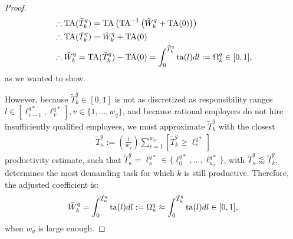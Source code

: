 \documentclass[hidelinks, nonatbib]{elsarticle}
\begin{document}
\begin{corollary}
\begin{proof}
\begin{align}
            &
            \therefore
            \text{TA}
            (
                \tilde{T}_{k}^{q}
            )
            =
            \text{TA}
            \left(
                \text{TA}^{-1}
                \left(
                    \tilde{W}_{k}^{q}
                    +
                    \text{TA}(0)
                \right)
            \right)
            \\
            &
            \therefore
            \text{TA}
            (
                \tilde{T}_{k}^{q}
            )
            =
            \tilde{W}_{k}^{q}
            +
            \text{TA}(0)
            \\
            &
            \therefore
            \tilde{W}_{k}^{q}
            =
            \text{TA}
            (
                \tilde{T}_{k}^{q}
            )
            -
            \text{TA}(0)
            =
            \int_{0}^{\tilde{T}_{k}^{q}}
            \text{ta}(l)
            dl
            :=
            \Omega_{k}^{q}
            \in 
            [0,1]
            ,
        \end{align}
        as we wanted to show.
        
        However, because $\tilde{T}_{k}^{q} \in [0,1]$ is not as discretized as responsibility ranges $l \in [\ell_{v-1}^{q*},\ell_{v}^{q*}], v \in \{1, \dots, w_q\}$, and because rational employers do not hire insufficiently qualified employees, we must approximate $\tilde{T}_{k}^{q}$ with the closest 
        \begin{gather}
            \tilde{T}_{\kappa}^{q}
            :=
            \left(
                \frac{1}{w_q}
            \right)
            \sum_{v=1}^{w_q}
            \left[
                \tilde{T}_{k}^{q}
                \geq
                \ell_{v}^{q*}
            \right]
        \end{gather}
        productivity estimate, such that $\tilde{T}_{\kappa}^{q} = \ell_{\kappa}^{q*} \in \{\ell_{0}^{q*}, \dots, \ell_{w_q}^{q*}\}$, with $\tilde{T}_{\kappa}^{q} \lessapprox \tilde{T}_{k}^{q}$, determines the most demanding task for which $k$ is still productive. Therefore, the adjusted coefficient is:
        \begin{gather}
            \tilde{W}_{k}^{q}
            =
            \int_{0}^{\tilde{T}_{\kappa}^{q}}
            \text{ta}(l)
            dl
            :=
            \Omega_{\kappa}^{q}
            \approx
            \int_{0}^{\tilde{T}_{k}^{q}}
            \text{ta}(l)
            dl
            \in 
            [0,1]
            ,
        \end{gather}
        when $w_q$ is large enough.
        

\end{proof}
\end{corollary}
\end{document}
